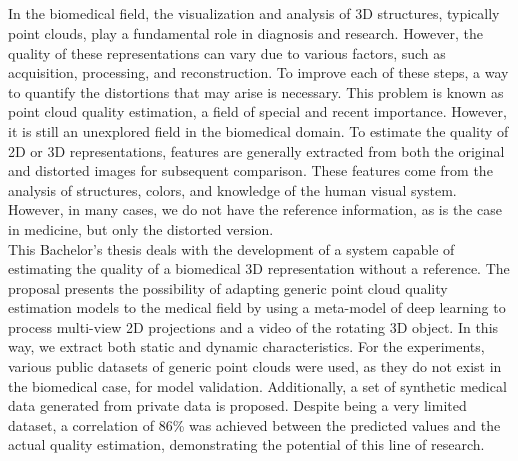 \cleardoublepage


\thispagestyle{empty}


\begin{center}
{\large\bfseries \myTitleENG}\\
\end{center}
\begin{center}
\myName \\
\end{center}

\\

\\

In the biomedical field, the visualization and analysis of 3D structures, 
typically point clouds, play a fundamental role in diagnosis and research. 
However, the quality of these representations can vary due to various factors, 
such as acquisition, processing, and reconstruction. 
To improve each of these steps, a way to quantify the distortions that may 
arise is necessary. This problem is known as point cloud quality estimation, 
a field of special and recent importance. However, it is still an unexplored 
field in the biomedical domain.
To estimate the quality of 2D or 3D representations, features are generally 
extracted from both the original and distorted images for subsequent comparison. 
These features come from the analysis of structures, colors, and knowledge of 
the human visual system. However, in many cases, we do not have the reference 
information, as is the case in medicine, but only the distorted version.
\\

This Bachelor's thesis deals with the development of a system capable of estimating 
the quality of a biomedical 3D representation without a reference. The proposal 
presents the possibility of adapting generic point cloud quality estimation models 
to the medical field by using a meta-model of deep learning to process multi-view 
2D projections and a video of the rotating 3D object. In this way, 
we extract both static and dynamic characteristics.
For the experiments, various public datasets of generic point clouds were used, 
as they do not exist in the biomedical case, for model validation. 
Additionally, a set of synthetic medical data generated from private data is proposed. 
Despite being a very limited dataset, a correlation of 86\% was achieved between 
the predicted values and the actual quality estimation, demonstrating the potential of this line of research.

